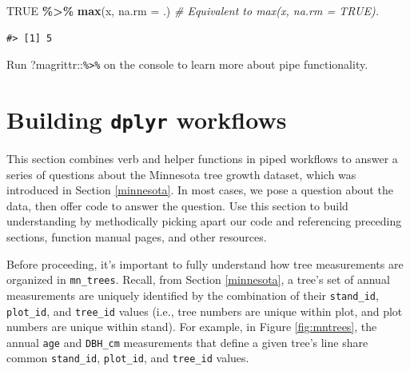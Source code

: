 \documentclass[
  11pt,
]{krantz}
\newenvironment{Shaded}{\begin{snugshade}}{\end{snugshade}}
\newcommand{\CommentTok}[1]{\textcolor[rgb]{0.56,0.35,0.01}{\textit{#1}}}
\newcommand{\DataTypeTok}[1]{\textcolor[rgb]{0.13,0.29,0.53}{#1}}
\newcommand{\KeywordTok}[1]{\textcolor[rgb]{0.13,0.29,0.53}{\textbf{#1}}}
\newcommand{\NormalTok}[1]{#1}
\newcommand{\OperatorTok}[1]{\textcolor[rgb]{0.81,0.36,0.00}{\textbf{#1}}}
\newcommand{\OtherTok}[1]{\textcolor[rgb]{0.56,0.35,0.01}{#1}}
\newcommand{\StringTok}[1]{\textcolor[rgb]{0.31,0.60,0.02}{#1}}
\theoremstyle{definition}
\theoremstyle{definition}
\theoremstyle{definition}
\theoremstyle{definition}
\theoremstyle{remark}
\begin{document}
\begin{Shaded}
\begin{Highlighting}[]
\OtherTok{TRUE} \OperatorTok{\%\textgreater{}\%}\StringTok{ }\KeywordTok{max}\NormalTok{(x, }\DataTypeTok{na.rm =}\NormalTok{ .) }\CommentTok{\# Equivalent to max(x, na.rm = TRUE).}
\end{Highlighting}
\end{Shaded}

\begin{verbatim}
#> [1] 5
\end{verbatim}

Run ?magrittr::\texttt{\%\textgreater{}\%} on the console to learn more about pipe functionality.

\hypertarget{dplyrworkflow}{%
\section{\texorpdfstring{Building \texttt{dplyr} workflows}{Building dplyr workflows}}\label{dplyrworkflow}}

This section combines verb and helper functions in piped workflows to answer a series of questions about the Minnesota tree growth dataset, which was introduced in Section \ref{minnesota}. In most cases, we pose a question about the data, then offer code to answer the question. Use this section to build understanding by methodically picking apart our code and referencing preceding sections, function manual pages, and other resources.

Before proceeding, it's important to fully understand how tree measurements are organized in \texttt{mn\_trees}. Recall, from Section \ref{minnesota}, a tree's set of annual measurements are uniquely identified by the combination of their \texttt{stand\_id}, \texttt{plot\_id}, and \texttt{tree\_id} values (i.e., tree numbers are unique within plot, and plot numbers are unique within stand). For example, in Figure \ref{fig:mntrees}, the annual \texttt{age} and \texttt{DBH\_cm} measurements that define a given tree's line share common \texttt{stand\_id}, \texttt{plot\_id}, and \texttt{tree\_id} values.
\end{document}
